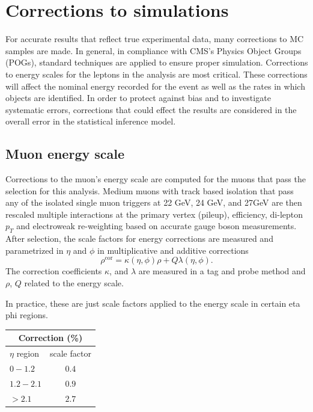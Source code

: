 \section{Corrections to simulations}
\label{sec:corrections}

For accurate results that reflect true experimental data, many corrections to MC samples are made. In general, in compliance with CMS's Physics Object Groups (POGs), standard techniques are applied to ensure proper simulation. Corrections to energy scales for the leptons in the analysis are most critical. These corrections will affect the nominal energy recorded for the event as well as the rates in which objects are identified.  In order to protect against bias and to investigate systematic errors, corrections that could effect the results are considered in the overall error in the statistical inference model.

\subsection{Muon energy scale}
Corrections to the muon's energy scale are computed for the muons that pass the selection for this analysis. Medium muons with track based isolation that pass any of the isolated single muon triggers at 22 GeV, 24 GeV, and 27GeV are then rescaled multiple interactions at the primary vertex (pileup), efficiency, di-lepton $p_T$ and electroweak re-weighting based on accurate gauge boson measurements. After selection, the scale factors for energy corrections are measured and parametrized in $\eta$ and $\phi$ in multiplicative and additive corrections 
\begin{equation}\rho^{\text{cor}}=\kappa(\eta,\phi)\rho+Q \lambda(\eta,\phi)\text{.}\end{equation} 
The correction coefficients $\kappa$, and $\lambda$ are measured in a tag and probe method and $\rho$, $Q$ related to the energy scale.

In practice, these are just scale factors applied to the energy scale in certain eta phi regions. \\
\begin{table}[h]
  \begin{center}
    \label{tab:MES}
    \begin{tabular} { l | c }
      \hline \multicolumn{2}{c}{Correction (\%)} \\
      \hline $\eta$ region & scale factor  \\ \hline
      $0 - 1.2$ & $0.4$ \\ 
      $1.2 - 2.1 $& $0.9 $\\ 
      $> 2.1$ & $2.7$ \\ 
    \end{tabular}
  \end{center}
\end{table}\\

